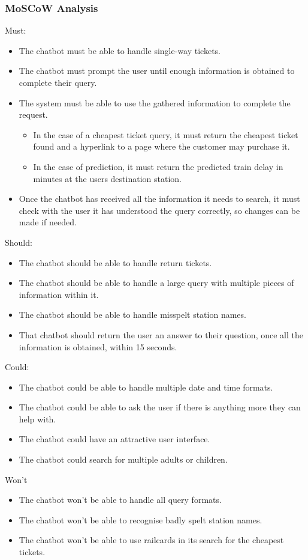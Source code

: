 \documentclass[11pt]{article}
\begin{document}
	\subsubsection{MoSCoW Analysis}
	Must:
	\begin{itemize}	
		\item The chatbot must be able to handle single-way tickets.		
		\item The chatbot must prompt the user until enough information is obtained to complete their query.
		\item The system must be able to use the gathered information to complete the request. 
		\begin{itemize}
			\item In the case of a cheapest ticket query, it must return the cheapest ticket found and a hyperlink to a page where the customer may purchase it.
			\item In the case of prediction, it must return the predicted train delay in minutes at the users destination station.			
		\end{itemize}		
		\item Once the chatbot has received all the information it needs to search, it must check with the user it has understood the query correctly, so changes can be made if needed.
	\end{itemize}
	Should: 
	\begin{itemize}
		\item The chatbot should be able to handle return tickets.		
		\item The chatbot should be able to handle a large query with multiple pieces of information within it.
		\item The chatbot should be able to handle misspelt station names.
		\item That chatbot should return the user an answer to their question, once all the information is obtained, within 15 seconds.		
	\end{itemize}
	Could:
	\begin{itemize}
		\item The chatbot could be able to handle multiple date and time formats.		
		\item The chatbot could be able to ask the user if there is anything more they can help with.
		\item The chatbot could have an attractive user interface.
		\item The chatbot could search for multiple adults or children.				
	\end{itemize}
	Won't
	\begin{itemize}
		\item The chatbot won't be able to handle all query formats.
		\item The chatbot won't be able to recognise badly spelt station names.
		\item The chatbot won’t be able to use railcards in its search for the cheapest tickets.		
	\end{itemize}	 
	
\end{document}
